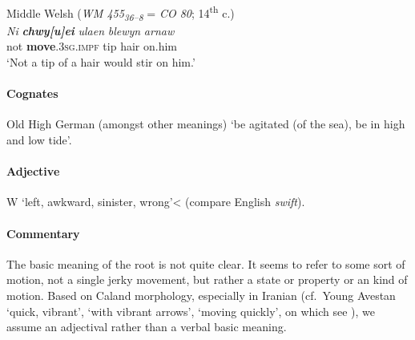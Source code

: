 \documentclass[output=paper,colorlinks,citecolor=brown]{langscibook}
\begin{document}
\begin{exe}
    \ex Middle Welsh (\textit{WM 455\textsubscript{36--8}} = \textit{CO 80}; 14\textsuperscript{th} c.)\label{ex:stativeswift}\\
        \gll \textit{Ni} \textit{\textbf{chwy[u]ei}}  \textit{ulaen} \textit{blewyn} \textit{arnaw}\\
        not \textbf{move}.3\textsc{sg.impf} tip hair on.him\\
        \glt ‘Not a tip of a hair would stir on him.’\\
\end{exe}

\paragraph*{Cognates} 
Old High German  (amongst other meanings) ‘be agitated (of the sea), be in high and low tide’.

\paragraph*{Adjective} 

W  ‘left, awkward, sinister, wrong’<  (compare English \textit{swift}).

\paragraph*{Commentary} 

The basic meaning of the root is not quite clear. It seems to refer to some sort of motion, not a single jerky movement, but rather a state or property or an  kind of motion. Based on Caland morphology,  especially in Iranian (cf.\ Young Avestan  ‘quick, vibrant’,  ‘with vibrant arrows’,  ‘moving quickly’, on which see \citealt{Schrijver2003}), we assume an adjectival  rather than a verbal basic meaning. 
\end{document}
